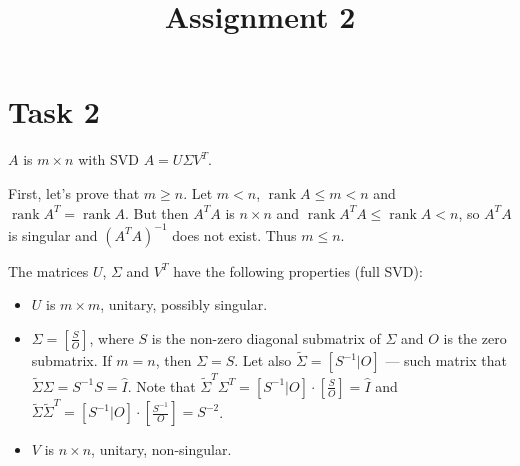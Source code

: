 \documentclass[14pt, notitlepage]{article}
\DeclareMathOperator{\rank}{rank}
\begin{document}
\title{Assignment 2}
\maketitle

\section*{Task 2}

$A$ is $m \times n$ with SVD $A = U \Sigma V^T $. 

First, let's prove that $ m \geqslant n $. Let $ m < n $, $\rank A \leqslant m < n$ and $ \rank A^T = \rank A $.
But then $A^T A$ is $n \times n$ and $ \rank A^T A \leqslant \rank A < n $, so $A^T A $ is singular and 
$\left( A^T A \right)^{-1} $ does not exist. Thus $ m \leqslant n $.

The matrices $U$, $\Sigma$ and $V^T$ have the following properties (full SVD):
\begin{itemize}
    \item $U$ is $ m \times m$, unitary, possibly singular.
    \item $\Sigma = \left[\frac{S}{O} \right] $, where $S$ is the non-zero diagonal submatrix of $\Sigma$
        and $O$ is the zero submatrix. If $m = n$, then $\Sigma = S$.
        Let also $\tilde{\Sigma} = \left[S^{-1} | O\right]$ --- such matrix that $\tilde{\Sigma} \Sigma = S^{-1}S = \hat{I}$.
        Note that $ \tilde{\Sigma}^T \Sigma^T = \left[ S^{-1} | O \right] \cdot \left[ \frac{S}{O} \right] = \hat{I} $ and
        $\tilde{\Sigma} \tilde{\Sigma}^T = \left[S^{-1} | O\right] \cdot \left[ \frac{S^{-1}}{O} \right] = S^{-2}$.
    \item $V$ is $n \times n$, unitary, non-singular.
\end{itemize}
\end{document}
